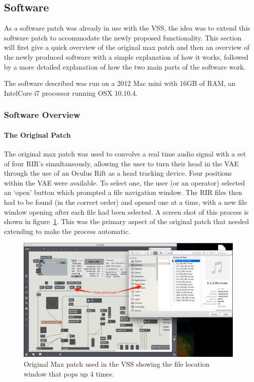 \documentclass[../../main.tex]{subfiles}
\begin{document}
\lstset{language=Java} 
	\subsection{Software}
	\label{software}
		
		As a software patch was already in use with the \ac{VSS}, the idea was to extend this software patch to accommodate the newly proposed functionality. This section will first give a quick overview of the original max patch and then an overview of the newly produced software with a simple explanation of how it works, followed by a more detailed explanation of how the two main parts of the software work.

		The software described was run on a 2012 Mac mini with 16GB of RAM, an IntelCore i7 processor running OSX 10.10.4.

		\subsubsection{Software Overview}

			\paragraph{The Original Patch}
			\label{softwareoverview:original}
				The original max patch was used to convolve a real time audio signal with a set of four \ac{RIR}'s simultaneously, allowing the user to turn their head in the \ac{VAE} through the use of an Oculus Rift as a head tracking device. Four positions within the \ac{VAE} were available. To select one, the user (or an operator) selected an `open' button which prompted a file navigation window. The \ac{RIR} files then had to be found (in the correct order) and opened one at a time, with a new file window opening after each file had been selected. A screen shot of this process is shown in figure~\ref{original}. This was the primary aspect of the original patch that needed extending to make the process automatic.

				\begin{figure}[H]
					\centerline{\includegraphics[scale = 0.3]{Sections/Implementation/Max/images/Max/OriginalPatch_Edit.png}}
					\caption{Original Max patch used in the \ac{VSS} showing the file location window that pops up 4 times.}
					\label{original}
				\end{figure}
\end{document}
